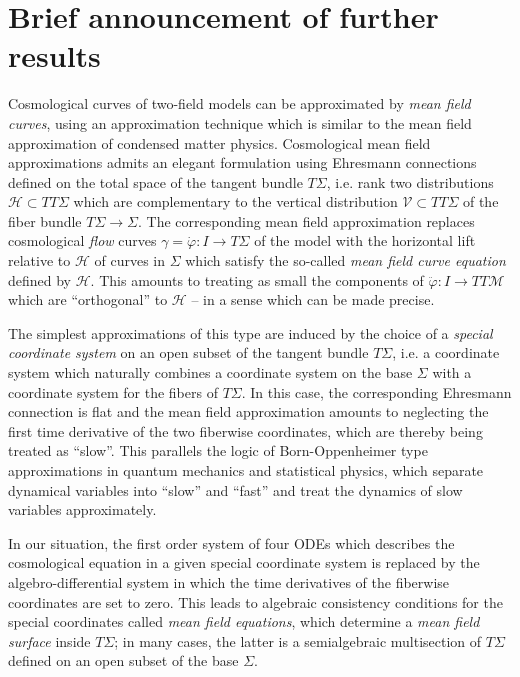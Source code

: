 \documentclass[a4paper,11pt]{article}
\theoremstyle{plain}
\theoremstyle{definition}
\theoremstyle{remark}
\def\cH{\mathcal{H}}
\def\cM{\mathcal{M}}
\def\cV{\mathcal{V}}
\begin{document}
\section{Brief announcement of further results}

Cosmological curves of two-field models can be approximated by {\em
  mean field curves}, using an approximation technique which is
similar to the mean field approximation of condensed matter
physics. Cosmological mean field approximations admits an elegant
formulation using Ehresmann connections defined on the total space of
the tangent bundle $T\Sigma$, i.e. rank two distributions $\cH\subset
TT\Sigma$ which are complementary to the vertical distribution
$\cV\subset TT\Sigma$ of the fiber bundle $T\Sigma\rightarrow \Sigma$.
The corresponding mean field approximation replaces cosmological {\em
  flow} curves $\gamma=\dot{\varphi}:I\rightarrow T\Sigma$ of the
model with the horizontal lift relative to $\cH$ of curves in $\Sigma$
which satisfy the so-called {\em mean field curve equation} defined by
$\cH$. This amounts to treating as small the components of
$\ddot{\varphi}:I\rightarrow TT\cM$ which are ``orthogonal'' to $\cH$
-- in a sense which can be made precise.

The simplest approximations of this type are induced by the choice of
a {\em special coordinate system} on an open subset of the tangent
bundle $T\Sigma$, i.e. a coordinate system which naturally combines a
coordinate system on the base $\Sigma$ with a coordinate system for
the fibers of $T\Sigma$. In this case, the corresponding Ehresmann
connection is flat and the mean field approximation amounts to
neglecting the first time derivative of the two fiberwise coordinates,
which are thereby being treated as ``slow''. This parallels the logic
of Born-Oppenheimer type approximations in quantum mechanics and
statistical physics, which separate dynamical variables into ``slow''
and ``fast'' and treat the dynamics of slow variables approximately.

In our situation, the first order system of four ODEs which describes
the cosmological equation in a given special coordinate system is
replaced by the algebro-differential system in which the time
derivatives of the fiberwise coordinates are set to zero. This leads
to algebraic consistency conditions for the special coordinates called
{\em mean field equations}, which determine a {\em mean field surface}
inside $T\Sigma$; in many cases, the latter is a semialgebraic
multisection of $T\Sigma$ defined on an open subset of the base
$\Sigma$.
\end{document}
